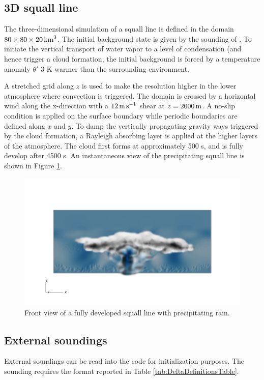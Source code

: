 \documentclass{article}
\begin{document}
\subsection{3D squall line}
\label{sq3D}
The three-dimensional simulation of a squall line is defined in the domain 
$80\times 80\times20\,{\rm km}^3$. 
The initial background state is given by the sounding of \cite{gabersekGiraldoDoyle2012}.
To initiate the vertical transport of water vapor to a level of condensation (and hence trigger a cloud formation, the initial background is forced by a temperature anomaly $\theta'$ $3$ K warmer than the surrounding environment. 

A stretched grid along $z$ is used to make the resolution higher in the lower atmosphere where convection is triggered.
The domain is crossed by a horizontal wind along the x-direction with a $12\,{\rm m\,s^{-1}}$ shear at $z=2000\,{\rm m}$.
A no-slip condition is applied on the surface boundary while periodic boundaries are defined along $x$ and $y$. 
To damp the vertically propagating gravity ways triggered by the cloud formation, a Rayleigh absorbing layer is applied at the higher layers of the atmosphere.
The cloud first forms at approximately 500 s, and is fully develop after 4500 s. 
An instantaneous view of the precipitating squall line is shown in Figure \ref{fig:benchmarks/squall1}. 

\begin{figure}[htbp]
\includegraphics[width=1.2\textwidth]{figures/squall_working_warm_rain_frontal_view0028.png}
\caption{Front view of a fully developed squall line with precipitating rain. }
\label{fig:benchmarks/squall1}
\end{figure}


\subsection{External soundings}
External soundings can be read into the code for initialization purposes. The sounding requires the format reported in Table \ref{tab:DeltaDefinitionsTable}.
\end{document}

